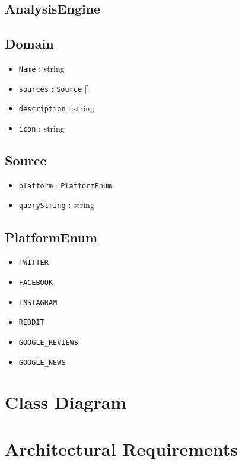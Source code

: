 \documentclass[12pt]{article}
\begin{document}
\subsection{AnalysisEngine}

\subsection{Domain}
\begin{itemize}
  \item \texttt{Name} : string
  \item \texttt{sources} : \texttt{Source} []
  \item \texttt{description} : string
  \item \texttt{icon} : string
\end{itemize}

\subsection{Source}
\begin{itemize}
  \item \texttt{platform} : \texttt{PlatformEnum}
  \item \texttt{queryString} : string
\end{itemize}

\subsection{PlatformEnum}
\begin{itemize}
  \item \texttt{TWITTER}
  \item \texttt{FACEBOOK}
  \item \texttt{INSTAGRAM}
  \item \texttt{REDDIT}
  \item \texttt{GOOGLE\_REVIEWS}
  \item \texttt{GOOGLE\_NEWS}
\end{itemize}

\newpage

\section{Class Diagram}

\newpage

\section{Architectural Requirements}
\end{document}
